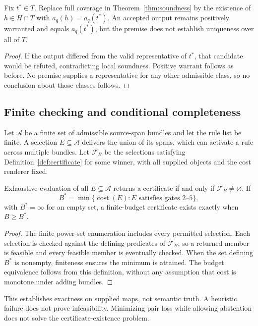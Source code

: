 \begin{corollary}
\label{cor:target-preservation}
Fix $t^*\in T$. Replace full coverage in Theorem~\ref{thm:soundness} by the
existence of $h\in H\cap T$ with $a_q(h)=a_q(t^*)$. An accepted output remains
positively warranted and equals $a_q(t^*)$, but the premise does not establish
uniqueness over all of $T$.
\end{corollary}
\begin{proof}
If the output differed from the valid representative of $t^*$, that candidate
would be refuted, contradicting local soundness. Positive warrant follows as
before. No premise supplies a representative for any other admissible class,
so no conclusion about those classes follows.
\end{proof}

\subsection{Finite checking and conditional completeness}

Let $\mathcal A$ be a finite set of admissible source-span bundles and let the
rule list be finite. A selection $E\subseteq\mathcal A$ delivers the union of
its spans, which can activate a rule across multiple bundles. Let
$\mathcal F_B$ be the selections satisfying Definition~\ref{def:certificate}
for some winner, with all supplied objects and the cost renderer fixed.

\begin{proposition}
\label{prop:finite-checking}
Exhaustive evaluation of all $E\subseteq\mathcal A$ returns a certificate if
and only if $\mathcal F_B\ne\varnothing$. If
\begin{equation}
 B^*=\min\{\operatorname{cost}(E):E\text{ satisfies gates 2--5}\},
\end{equation}
with $B^*=\infty$ for an empty set, a finite-budget certificate exists exactly
when $B\ge B^*$.
\end{proposition}
\begin{proof}
The finite power-set enumeration includes every permitted selection. Each
selection is checked against the defining predicates of $\mathcal F_B$, so a
returned member is feasible and every feasible member is eventually checked.
When the set defining $B^*$ is nonempty, finiteness ensures the minimum is
attained. The budget equivalence follows from this definition, without any
assumption that cost is monotone under adding bundles.
\end{proof}
This establishes exactness on supplied maps, not semantic truth. A heuristic
failure does not prove infeasibility. Minimizing pair loss while allowing
abstention does not solve the certificate-existence problem.

